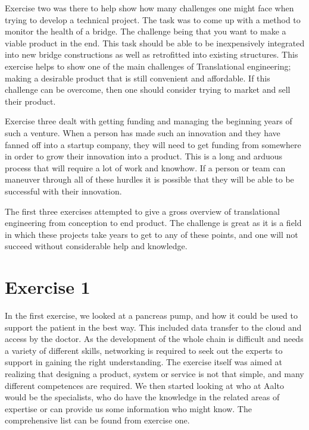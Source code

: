 \documentclass[english,12pt,a4paper,pdftex,elec,utf8]{aaltothesis}
\begin{document}
	Exercise two was there to help show how many challenges one might face when trying to develop a technical project. The task was to come up with a method to monitor the health of a bridge. The challenge being that you want to make a viable product in the end. This task should be able to be inexpensively integrated into new bridge constructions as well as retrofitted into existing structures. This exercise helps to show one of the main challenges of Translational engineering; making a desirable product that is still convenient and affordable. If this challenge can be overcome, then one should consider trying to market and sell their product. 
	
	Exercise three dealt with getting funding and managing the beginning years of such a venture. When a person has made such an innovation and they have fanned off into a startup company, they will need to get funding from somewhere in order to grow their innovation into a product. This is a long and arduous process that will require a lot of work and knowhow. If a person or team can maneuver through all of these hurdles it is possible that they will be able to be successful with their innovation. 
	
	The first three exercises attempted to give a gross overview of translational engineering from conception to end product. The challenge is great as it is a field in which these projects take years to get to any of these points, and one will not succeed without considerable help and knowledge. 
	


\newpage


\section*{Exercise 1}

	In the first exercise, we looked at a pancreas pump, and how it could be used to support the patient in the best way. This included data transfer to the cloud and access by the doctor. As the development of the whole chain is difficult and needs a variety of different skills, networking is required to seek out the experts to support in gaining the right understanding. The exercise itself was aimed at realizing that designing a product, system or service is not that simple, and many different competences are required. We then started looking at who at Aalto would be the specialists, who do have the knowledge in the related areas of expertise or can provide us some information who might know. The comprehensive list can be found from exercise one. 
\end{document}
